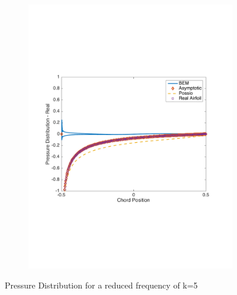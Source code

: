 \documentclass{article}
\begin{document}
\begin{figure}[h]
\begin{subfigure}{0.33\textwidth}
	\includegraphics[width = \textwidth, height=0.2\textheight]{Pressure_k5real}
\end{subfigure}%
\caption{Pressure Distribution for a reduced frequency of k=5}
\end{figure}
\end{document}

